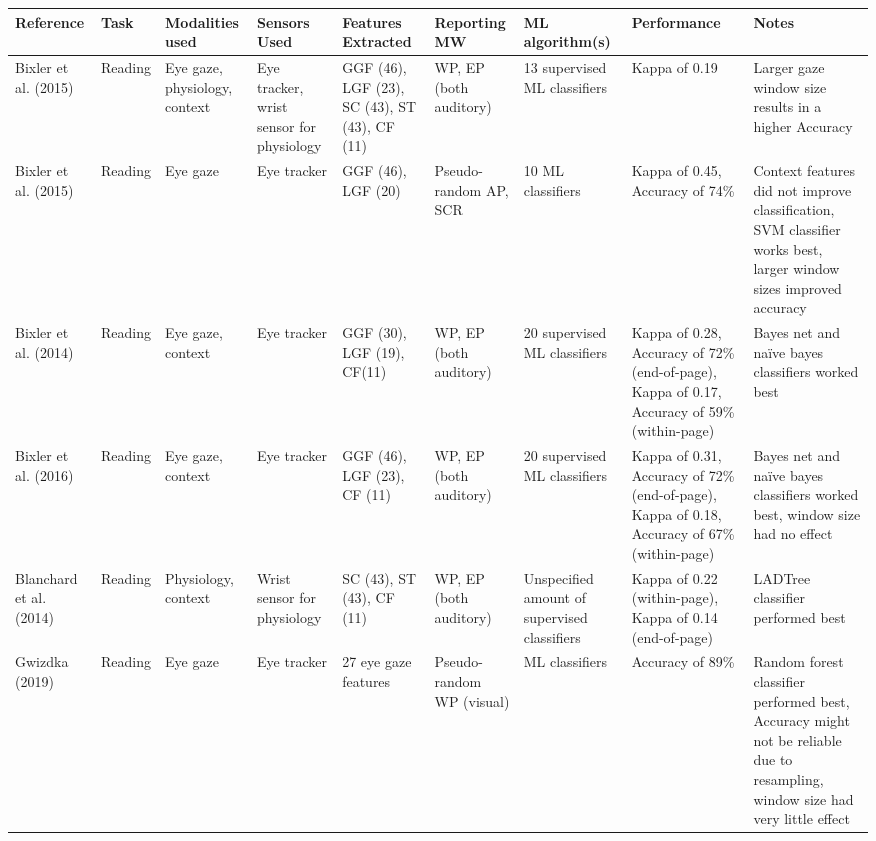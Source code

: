 \begin{ThreePartTable}
\small %
        \begin{xtabular}{P{20mm}P{28mm}P{26mm}P{30mm}P{29mm}P{23mm}P{33mm}P{24mm}P{46mm}}
                \toprule
                Reference & Task & Modalities used & Sensors Used & Features Extracted \footnotemark[1] & Reporting MW \footnotemark[2] & ML algorithm(s) & Performance & Notes\\
                \midrule
                Bixler et al. (2015) \cite{Bixler2015AutomaticPhysiology} & Reading & Eye gaze, physiology, context & Eye tracker, wrist sensor for physiology & GGF (46), LGF (23), SC (43), ST (43), CF (11) & WP, EP (both auditory) & 13 supervised ML classifiers & Kappa of 0.19 & Larger gaze window size results in a higher Accuracy \\ \midrule
                Bixler et al. (2015) \cite{Bixler2015AutomaticAwareness} & Reading & Eye gaze & Eye tracker & GGF (46), LGF (20) & Pseudo-random AP, SCR & 10 ML classifiers & Kappa of 0.45, Accuracy of 74\% & Context features did not improve classification, SVM classifier works best, larger window sizes improved accuracy\\ \midrule
                Bixler et al. (2014) \cite{Bixler2014TowardWanderingd} & Reading & Eye gaze, context & Eye tracker & GGF (30), LGF (19), CF(11) & WP, EP (both auditory) & 20 supervised ML classifiers & Kappa of 0.28, Accuracy of 72\% (end-of-page), Kappa of 0.17, Accuracy of 59\% (within-page) & Bayes net and naïve bayes classifiers worked best \\ \midrule
                Bixler et al. (2016) \cite{Bixler2016AutomaticReadingd} & Reading & Eye gaze, context & Eye tracker & GGF (46), LGF (23), CF (11) & WP, EP (both auditory) & 20 supervised ML classifiers & Kappa of 0.31, Accuracy of 72\% (end-of-page), Kappa of 0.18, Accuracy of 67\% (within-page) & Bayes net and naïve bayes classifiers worked best, window size had no effect \\ \midrule
                Blanchard et al. (2014) \cite{Blanchard2014AutomatedLearning} & Reading & Physiology, context & Wrist sensor for physiology & SC (43), ST (43), CF (11) & WP, EP (both auditory) & Unspecified amount of supervised classifiers & Kappa of 0.22 (within-page), Kappa of 0.14 (end-of-page) & LADTree classifier performed best \\ \midrule
                Gwizdka (2019) \cite{Gwizdka2019ExploringTasks} & Reading & Eye gaze & Eye tracker & 27 eye gaze features & Pseudo-random WP (visual) & ML classifiers & Accuracy of 89\% & Random forest classifier performed best, Accuracy might not be reliable due to resampling, window size had very little effect \\ \midrule

\end{xtabular}
\end{ThreePartTable}
